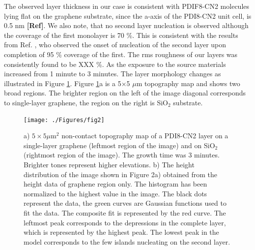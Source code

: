 \documentclass[preprint,aip,jap]{revtex4-2}
\begin{document}
The observed layer thickness in our case is consistent with PDIF8-CN2 molecules lying flat on the graphene substrate, since the a-axis of the PDI8-CN2 unit cell, is 0.5 nm \textbf{[Ref]}. We also note, that no second layer nucleation is observed although the coverage of the first monolayer is 70 \%. This is consistent with the results from Ref. , who observed the onset of nucleation of the second layer upon completion of 95 \% coverage of the first. The rms roughness of our layers was consistently found to be XXX \%. As the exposure to the source materials increased from 1 minute to 3 minutes. The layer morphology changes as illustrated in Figure \ref{fig:2}. Figure \ref{fig:2}a is a  5$\times$5 $\mu$m topography map and shows two broad regions. The brighter region on the left of the image diagonal corresponds to single-layer graphene, the region on the right is SiO$_{2}$ substrate. 
\begin{figure}[htb]
  \centering
   \texttt{[image: ./Figures/fig2]}
  \caption{a) $5\times5 \mu$m$^{2}$ non-contact topography map of a PDI8-CN2 layer on a single-layer graphene (leftmost region of the image) and on SiO$_{2}$ (rightmost region of the image). The growth time was 3 minutes. Brighter tones represent higher elevations. b) The height distribution of the image shown in Figure 2a) obtained from the height data of graphene region only. The histogram has been normalized to the highest value in the image. The black dots represent the data, the green curves are Gaussian functions used to fit the data. The composite fit is represented by the red curve.  The leftmost peak corresponds to the depressions in the complete layer, which is represented by the highest peak. The lowest peak in the model corresponds to the few islands nucleating on the second layer.}
  \label{fig:2}
\end{figure}
\end{document}

